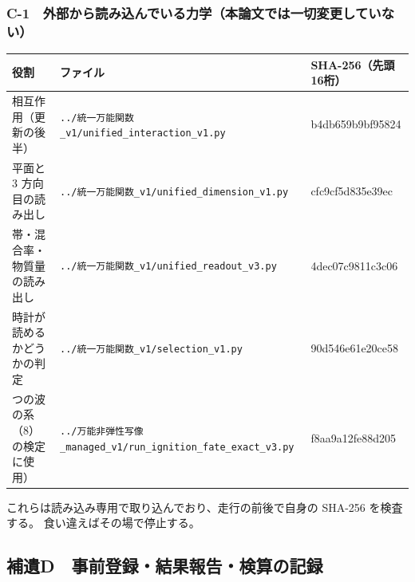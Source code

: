 \documentclass[
]{ltjsarticle}
\newcounter{none} %
\begin{document}
\subsubsection{C-1　外部から読み込んでいる力学（本論文では一切変更していない）}\label{c-1-ux5916ux90e8ux304bux3089ux8aadux307fux8fbcux3093ux3067ux3044ux308bux529bux5b66ux672cux8ad6ux6587ux3067ux306fux4e00ux5207ux5909ux66f4ux3057ux3066ux3044ux306aux3044}

{\def\LTcaptype{none} %
\begin{longtable}[]{@{}
  >{\raggedright\arraybackslash}p{}
  >{\raggedright\arraybackslash}p{}
  >{\raggedright\arraybackslash}p{}@{}}
\toprule\noalign{}
\begin{minipage}[b]{\linewidth}\raggedright
役割
\end{minipage} & \begin{minipage}[b]{\linewidth}\raggedright
ファイル
\end{minipage} & \begin{minipage}[b]{\linewidth}\raggedright
SHA-256（先頭16桁）
\end{minipage} \\
\midrule\noalign{}
\endhead
\bottomrule\noalign{}
\endlastfoot
相互作用（更新の後半） &
\texttt{../統一万能関数\_v1/unified\_interaction\_v1.py} &
b4db659b9bf95824 \\
平面と 3 方向目の読み出し &
\texttt{../統一万能関数\_v1/unified\_dimension\_v1.py} &
cfc9cf5d835e39ec \\
帯・混合率・物質量の読み出し &
\texttt{../統一万能関数\_v1/unified\_readout\_v3.py} &
4dec07c9811c3c06 \\
時計が読めるかどうかの判定 &
\texttt{../統一万能関数\_v1/selection\_v1.py} & 90d546e61e20ce58 \\
2 つの波の系（8）の検定に使用） &
\texttt{../万能非弾性写像\_managed\_v1/run\_ignition\_fate\_exact\_v3.py}
& f8aa9a12fe88d205 \\
\end{longtable}
}

これらは読み込み専用で取り込んでおり、走行の前後で自身の SHA-256
を検査する。 食い違えばその場で停止する。

\subsection{補遺D　事前登録・結果報告・検算の記録}\label{ux88dcux907ad-ux4e8bux524dux767bux9332ux7d50ux679cux5831ux544aux691cux7b97ux306eux8a18ux9332}
\end{document}
